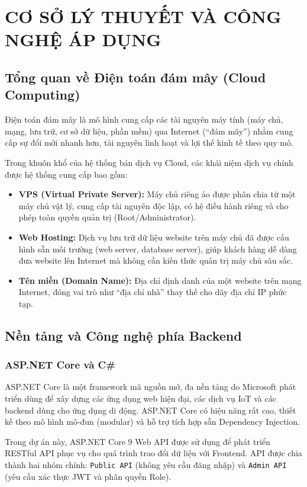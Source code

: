 \chapter{CƠ SỞ LÝ THUYẾT VÀ CÔNG NGHỆ ÁP DỤNG}

\section{Tổng quan về Điện toán đám mây (Cloud Computing)}
Điện toán đám mây là mô hình cung cấp các tài nguyên máy tính (máy chủ, mạng, lưu trữ, cơ sở dữ liệu, phần mềm) qua Internet (``đám mây'') nhằm cung cấp sự đổi mới nhanh hơn, tài nguyên linh hoạt và lợi thế kinh tế theo quy mô. 

Trong khuôn khổ của hệ thống bán dịch vụ Cloud, các khái niệm dịch vụ chính được hệ thống cung cấp bao gồm:
\begin{itemize}
    \item \textbf{VPS (Virtual Private Server):} Máy chủ riêng ảo được phân chia từ một máy chủ vật lý, cung cấp tài nguyên độc lập, có hệ điều hành riêng và cho phép toàn quyền quản trị (Root/Administrator).
    \item \textbf{Web Hosting:} Dịch vụ lưu trữ dữ liệu website trên máy chủ đã được cấu hình sẵn môi trường (web server, database server), giúp khách hàng dễ dàng đưa website lên Internet mà không cần kiến thức quản trị máy chủ sâu sắc.
    \item \textbf{Tên miền (Domain Name):} Địa chỉ định danh của một website trên mạng Internet, đóng vai trò như ``địa chỉ nhà'' thay thế cho dãy địa chỉ IP phức tạp.
\end{itemize}

\section{Nền tảng và Công nghệ phía Backend}

\subsection{ASP.NET Core và C\#}
ASP.NET Core \cite{microsoft_docs} là một framework mã nguồn mở, đa nền tảng do Microsoft phát triển dùng để xây dựng các ứng dụng web hiện đại, các dịch vụ IoT và các backend dùng cho ứng dụng di động. ASP.NET Core có hiệu năng rất cao, thiết kế theo mô hình mô-đun (modular) và hỗ trợ tích hợp sẵn Dependency Injection. 

Trong dự án này, ASP.NET Core 9 Web API được sử dụng để phát triển RESTful API phục vụ cho quá trình trao đổi dữ liệu với Frontend. API được chia thành hai nhóm chính: \texttt{Public API} (không yêu cầu đăng nhập) và \texttt{Admin API} (yêu cầu xác thực JWT và phân quyền Role).

